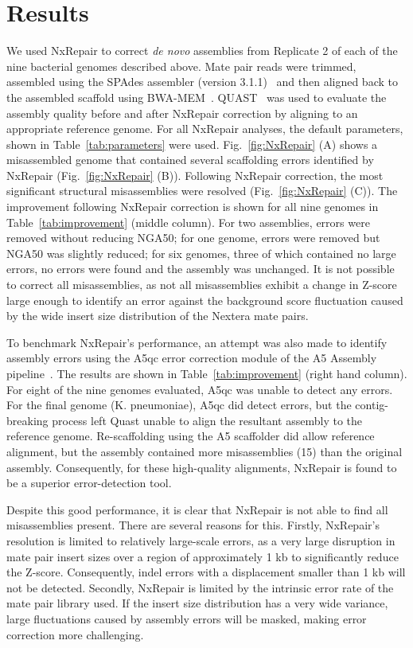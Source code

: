 \section{Results}
We used NxRepair to correct \textit{de novo} assemblies from Replicate 2 of each of the nine bacterial genomes described above. Mate pair reads were trimmed, assembled using the SPAdes assembler (version 3.1.1)~\cite{Bankevich2012} and then aligned back to the assembled scaffold using BWA-MEM~\cite{li2013}. QUAST~\cite{Gurevich2013} was used to evaluate the assembly quality before and after NxRepair correction by aligning to an appropriate reference genome. For all NxRepair analyses, the default parameters, shown in Table~\ref{tab:parameters} were used. Fig.~\ref{fig:NxRepair} (A) shows a misassembled genome that contained several scaffolding errors identified by NxRepair (Fig.~\ref{fig:NxRepair} (B)). Following NxRepair correction, the most significant structural misassemblies were resolved (Fig.~\ref{fig:NxRepair} (C)). The improvement following NxRepair correction is shown for all nine genomes in Table~\ref{tab:improvement} (middle column). For two assemblies, errors were removed without reducing NGA50; for one genome, errors were removed but NGA50 was slightly reduced; for six genomes, three of which contained no large errors, no errors were found and the assembly was unchanged. It is not possible to correct all misassemblies, as not all misassemblies exhibit a change in Z-score large enough to identify an error against the background score fluctuation caused by the wide insert size distribution of the Nextera mate pairs. 

To benchmark NxRepair's performance, an attempt was also made to identify assembly errors using the A5qc error correction module of the A5 Assembly pipeline~\cite{tritt2012}. The results are shown in Table~\ref{tab:improvement} (right hand column). For eight of the nine genomes evaluated, A5qc was unable to detect any errors. For the final genome (K. pneumoniae), A5qc did detect errors, but the contig-breaking process left Quast unable to align the resultant assembly to the reference genome. Re-scaffolding using the A5 scaffolder did allow reference alignment, but the assembly contained more misassemblies (15) than the original assembly. Consequently, for these high-quality alignments, NxRepair is found to be a superior error-detection tool. 

Despite this good performance, it is clear that NxRepair is not able to find all misassemblies present. There are several reasons for this. Firstly, NxRepair's resolution is limited to relatively large-scale errors, as a very large disruption in mate pair insert sizes over a region of approximately 1 kb to significantly reduce the Z-score. Consequently, indel errors with a displacement smaller than 1 kb will not be detected. Secondly, NxRepair is limited by the intrinsic error rate of the mate pair library used. If the insert size distribution has a very wide variance, large fluctuations caused by assembly errors will be masked, making error correction more challenging. 

